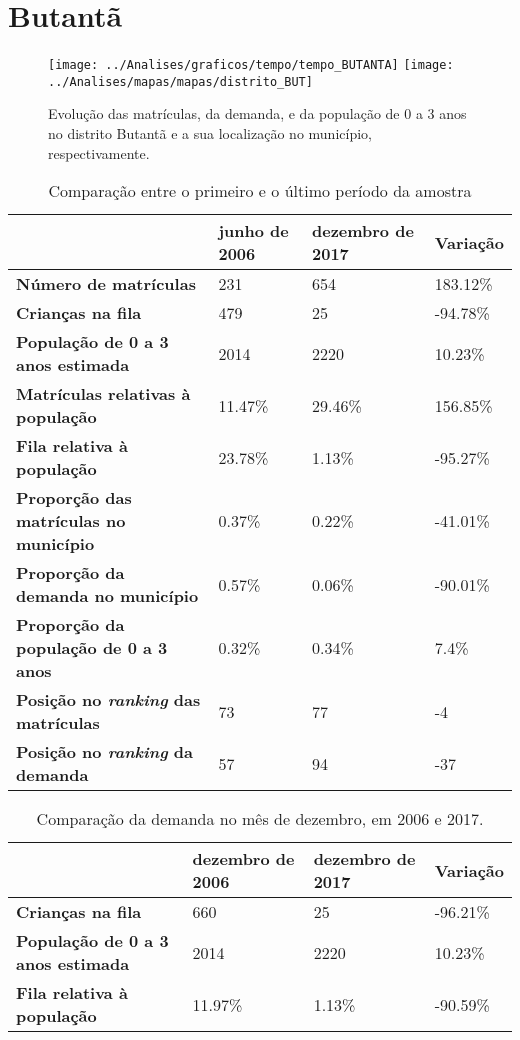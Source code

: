 \section{Butantã}
\begin{figure}[H]
	\centering
	\texttt{[image: ../Analises/graficos/tempo/tempo\_BUTANTA]}
	\texttt{[image: ../Analises/mapas/mapas/distrito\_BUT]}
	\caption{Evolução das matrículas, da demanda, e da população de 0 a 3 anos no distrito Butantã e a sua localização no município, respectivamente.}
\end{figure}
\begin{table}[H]
	\begin{tabular}{|l|l|l|l|}
		\hline
		\textbf{}                                      & \textbf{junho de 2006}       & \textbf{dezembro de 2017}    & \textbf{Variação} \\ \hline
		\textbf{Número de matrículas}                  & 231 & 654 & 183.12\% \\ \hline
		\textbf{Crianças na fila}                      & 479 & 25 & -94.78\% \\ \hline
		\textbf{População de 0 a 3 anos estimada}      & 2014 & 2220 & 10.23\% \\ \hline
		\textbf{Matrículas relativas à população}      & 11.47\% & 29.46\% & 156.85\% \\ \hline
		\textbf{Fila relativa à população}             & 23.78\% & 1.13\% & -95.27\% \\ \hline
		\textbf{Proporção das matrículas no município} & 0.37\% & 0.22\% & -41.01\% \\ \hline
		\textbf{Proporção da demanda no município}     & 0.57\% & 0.06\% & -90.01\% \\ \hline
		\textbf{Proporção da população de 0 a 3 anos}  & 0.32\% & 0.34\% & 7.4\% \\ \hline
		\textbf{Posição no \textit{ranking} das matrículas}     & 73 & 77 & -4 \\ \hline
		\textbf{Posição no \textit{ranking} da demanda}         & 57 & 94 & -37 \\ \hline
	\end{tabular}
	\caption{Comparação entre o primeiro e o último período da amostra}
\end{table}
\begin{table}[H]
	\begin{tabular}{|l|l|l|l|}
		\hline
		\textbf{}                                 & \textbf{dezembro de 2006} & \textbf{dezembro de 2017} & \textbf{Variação} \\ \hline
		\textbf{Crianças na fila}                      & 660 & 25 & -96.21\% \\ \hline
		\textbf{População de 0 a 3 anos estimada}      & 2014 & 2220 & 10.23\% \\ \hline
		\textbf{Fila relativa à população}             & 11.97\% & 1.13\% & -90.59\% \\ \hline
	\end{tabular}
	\caption{Comparação da demanda no mês de dezembro, em 2006 e 2017.}
\end{table}
